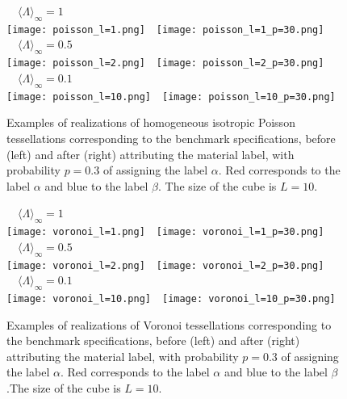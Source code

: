 \documentclass[final,authoryear,5p,times,twocolumn]{elsarticle}
\begin{document}
\begin{figure}[t]
\begin{center}
\,\,\,\, ${\langle \Lambda \rangle}_{\infty} =1$ \,\,\,\,\\
\texttt{[image: poisson\_l=1.png]}\,\,\,\,
\texttt{[image: poisson\_l=1\_p=30.png]}\\
\,\,\,\, ${\langle \Lambda \rangle}_{\infty} =0.5$ \,\,\,\,\\
\texttt{[image: poisson\_l=2.png]}\,\,\,\,
\texttt{[image: poisson\_l=2\_p=30.png]}\\
\,\,\,\, ${\langle \Lambda \rangle}_{\infty} =0.1$ \,\,\,\,\\
\texttt{[image: poisson\_l=10.png]}\,\,\,\,
\texttt{[image: poisson\_l=10\_p=30.png]}\\
\end{center}
\caption{Examples of realizations of homogeneous isotropic Poisson tessellations corresponding to the benchmark specifications, before (left) and after (right) attributing the material label, with probability $p=0.3$ of assigning the label $\alpha$. Red corresponds to the label $\alpha$ and blue to the label $\beta$. The size of the cube is $L=10$.}
\label{geo_poisson}
\end{figure}

\begin{figure}[t]
\begin{center}
\,\,\,\, ${\langle \Lambda \rangle}_{\infty} =1$ \,\,\,\,\\
\texttt{[image: voronoi\_l=1.png]}\,\,\,\,
\texttt{[image: voronoi\_l=1\_p=30.png]}\\
\,\,\,\, ${\langle \Lambda \rangle}_{\infty} =0.5$ \,\,\,\,\\
\texttt{[image: voronoi\_l=2.png]}\,\,\,\,
\texttt{[image: voronoi\_l=2\_p=30.png]}\\
\,\,\,\, ${\langle \Lambda \rangle}_{\infty} =0.1$ \,\,\,\,\\
\texttt{[image: voronoi\_l=10.png]}\,\,\,\,
\texttt{[image: voronoi\_l=10\_p=30.png]}\\
\end{center}
\caption{Examples of realizations of Voronoi tessellations corresponding to the benchmark specifications, before (left) and after (right) attributing the material label, with probability $p=0.3$ of assigning the label $\alpha$. Red corresponds to the label $\alpha$ and blue to the label $\beta$.The size of the cube is $L=10$.}
\label{geo_voronoi}
\end{figure}
\end{document}
